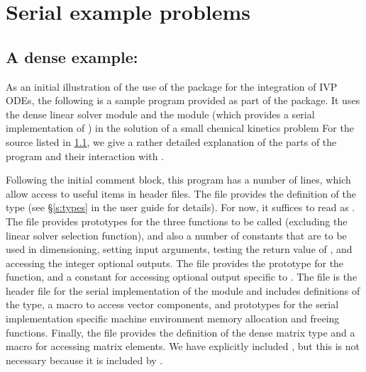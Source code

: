 \section{Serial example problems}\label{s:ex_serial}

\subsection{A dense example: }\label{ss:cvdx}

As an initial illustration of the use of the {\cvode} package for the
integration of IVP ODEs, the following is a sample program provided as part 
of the package.  It uses the {\cvode} dense linear solver module {\cvdense} 
and the {\nvecs} module (which provides a serial implementation of {\nvector})
in the solution of a small chemical kinetics problem
For the source listed in \A\ref{ss:cvdx}, we give a rather detailed explanation of 
the parts of the program and their interaction with {\cvode}.

Following the initial comment block, this program has a number
of  lines, which allow access to useful items in {\cvode}
header files.  The  file provides the definition of the
type  (see \S\ref{s:types} in the user guide for
details).  For now, it suffices to read  as .
The  file provides prototypes for the three {\cvode}
functions to be called (excluding the linear solver selection
function), and also a number of constants that are to be used in
dimensioning, setting input arguments, testing the return value of
, and accessing the integer optional outputs.
The  file provides the prototype for the  
function, and a constant  for accessing optional output 
specific to {\cvdense}.  
The  file is the header file for the serial implementation
of the {\nvector} module and includes definitions of the 
 type, a macro to access vector components, and prototypes 
for the serial implementation specific machine environment memory allocation
and freeing functions.
Finally, the  file provides the definition of the dense
matrix type  and a macro for accessing matrix elements.
We have explicitly included , but this is not necessary because 
it is included by .


